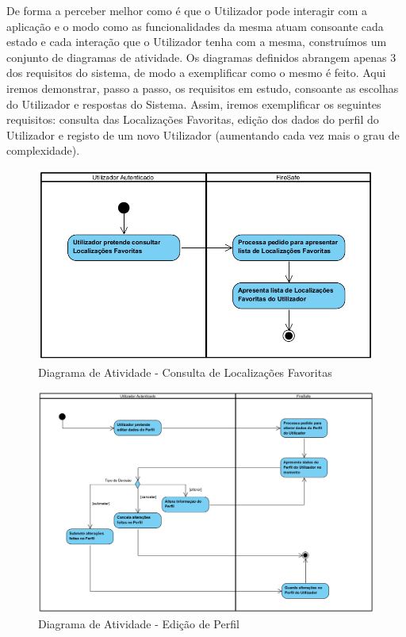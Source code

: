 \documentclass[a4paper,12pt]{scrreprt}
\newcommand{\tab}{
    \hspace{1cm}}
\begin{document}
\tab De forma a perceber melhor como é que o Utilizador pode interagir com a aplicação e o modo como as funcionalidades da mesma atuam consoante cada estado e cada interação que o Utilizador tenha com a mesma, construímos um conjunto de diagramas de atividade. Os diagramas definidos abrangem apenas 3 dos requisitos do sistema, de modo a exemplificar como o mesmo é feito. Aqui iremos demonstrar, passo a passo, os requisitos em estudo, consoante as escolhas do Utilizador e respostas do Sistema. Assim, iremos exemplificar os seguintes requisitos: consulta das Localizações Favoritas, edição dos dados do perfil do Utilizador e registo de um novo Utilizador (aumentando cada vez mais o grau de complexidade).

\vspace{1.5cm}

\begin{figure}[H]
    \centering
    \includegraphics[width=1\textwidth]{images/Fase2/6.DiagramasDeAtividade/1.atividadeConsultarLocalizacoes.png}
    \caption{Diagrama de Atividade - Consulta de Localizações Favoritas}
\end{figure}

\begin{figure}[H]
    \centering
    \includegraphics[width=.9\textwidth]{images/Fase2/6.DiagramasDeAtividade/2.atividadeEditaPerfil.png}
    \caption{Diagrama de Atividade - Edição de Perfil}
\end{figure}
\end{document}
